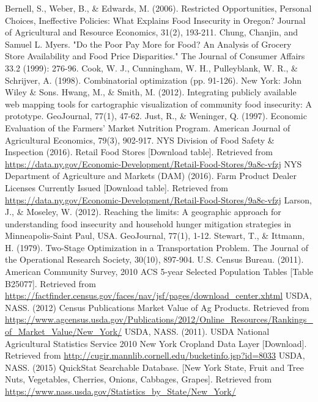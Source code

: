 \documentclass{report}
\begin{document}
\begin{thebibliography}{99}
Bernell, S., Weber, B., {\&} Edwards, M. (2006). Restricted Opportunities, Personal Choices, Ineffective Policies: What Explains Food Insecurity in Oregon? Journal of Agricultural and Resource Economics, 31(2), 193-211. 
 Chung, Chanjin, and Samuel L. Myers. "Do the Poor Pay More for Food? An Analysis of Grocery Store Availability and Food Price Disparities." The Journal of Consumer Affairs 33.2 (1999): 276-96.
 Cook, W. J., Cunningham, W. H., Pulleyblank, W. R.,  {\&}  Schrijver, A. (1998). Combinatorial optimization (pp. 91-126). New York: John Wiley  {\&}  Sons.
 Hwang, M., {\&} Smith, M. (2012). Integrating publicly available web mapping tools for cartographic visualization of community food insecurity: A prototype. GeoJournal, 77(1), 47-62.
 Just, R., {\&} Weninger, Q. (1997). Economic Evaluation of the Farmers' Market Nutrition Program. American Journal of Agricultural Economics, 79(3), 902-917.
 NYS Division of Food Safety {\&} Inspection (2016). Retail Food Stores [Download table]. Retrieved from \url{https://data.ny.gov/Economic-Development/Retail-Food-Stores/9a8c-vfzj}
 NYS Department of Agriculture and Markets (DAM) (2016). Farm Product Dealer Licenses Currently Issued [Download table]. Retrieved from \url{https://data.ny.gov/Economic-Development/Retail-Food-Stores/9a8c-vfzj}
 Larson, J., {\&} Moseley, W. (2012). Reaching the limits: A geographic approach for understanding food insecurity and household hunger mitigation strategies in Minneapolis-Saint Paul, USA. GeoJournal, 77(1), 1-12.
 Stewart, T., {\&} Ittmann, H. (1979). Two-Stage Optimization in a Transportation Problem. The Journal of the Operational Research Society, 30(10), 897-904.
 U.S. Census Bureau. (2011). American Community Survey, 2010 ACS 5-year Selected Population Tables [Table B25077]. Retrieved from \url{https://factfinder.census.gov/faces/nav/jsf/pages/download_center.xhtml}
 USDA, NASS. (2012) Census Publications Market Value of Ag Products. Retrieved from \url{https://www.agcensus.usda.gov/Publications/2012/Online_Resources/Rankings_of_Market_Value/New_York/}
 USDA, NASS. (2011). USDA National Agricultural Statistics Service 2010 New York Cropland Data Layer [Download]. Retrieved from \url{http://cugir.mannlib.cornell.edu/bucketinfo.jsp?id=8033}
 USDA, NASS. (2015) QuickStat Searchable Database. [New York State, Fruit and Tree Nuts, Vegetables, Cherries, Onions, Cabbages, Grapes]. Retrieved from \url{https://www.nass.usda.gov/Statistics_by_State/New_York/}

\end{thebibliography}
\end{document}
